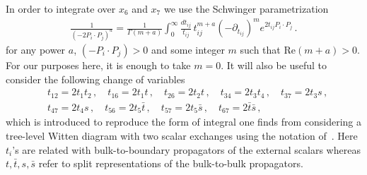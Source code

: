 In order to integrate over $x_6$ and $x_7$ we use the Schwinger parametrization
\begin{align}
  \label{eq:schwingerparam}
  \frac{1}{(-2 P_{i}\cdot P_j)^a}=\frac{1}{\Gamma\left(m+a\right)}\int_{0}^{\infty} \frac{dt_{ij}}{t_{ij}}\, t_{ij}^{m+a}(-\partial_{t_{ij}})^{m} e^{2t_{ij} P_{i}\cdot P_j}\,.
\end{align}
for any power $a$, $(-P_{i}\cdot P_j)>0$ and some integer $m$ such that $\text{Re}(m+a)>0$. For our purposes here, it is enough to take $m=0$. It will also be useful to consider the following change of variables
\begin{align}
  \label{eq:changevariablests}
   & t_{12}=2 t_1 t_2\,,\quad t_{16}=2 t_1 t \,,\quad t_{26}=2 t_2 t \,, \quad t_{34}= 2 t_3 t_4\,,\quad t_{37}=2 t_3 s\,,\nonumber \\
   & t_{47}=2 t_4 s\,,\quad t_{56}=2 t_5 \bar{t}\,,\quad t_{57}=2 t_5 \bar{s}\,,\quad t_{67}=2 \bar{t} \bar{s}\,,
\end{align}
which is introduced to reproduce the form of integral one finds from considering a tree-level Witten diagram with two scalar exchanges using the notation of~\cite{Penedones:2010ue}. Here $t_i$'s are related with bulk-to-boundary propagators of the external scalars whereas $t, \bar{t}, s, \bar{s}$ refer to split representations of the bulk-to-bulk propagators.

